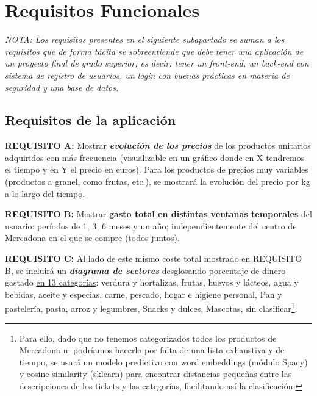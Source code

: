 \documentclass[a4paper,12pt]{report}
\begin{document}
		
		
		
		\section{Requisitos Funcionales}
		
			\textit{NOTA: Los requisitos presentes en el siguiente subapartado se suman a los requisitos que de forma tácita se sobreentiende que debe tener una aplicación de un proyecto final de grado superior; es decir: tener un front-end, un back-end con sistema de registro de usuarios, un login con buenas prácticas en materia de seguridad y una base de datos.}
		
		
			\subsection{Requisitos de la aplicación}
			\label{sec:requisitosAplicacion}
			
		

			

			
		
			
			\textbf{REQUISITO A:} Mostrar\textbf{ \textit{evolución de los precios}} de los productos unitarios adquiridos \underline{con más frecuencia} (visualizable en un gráfico donde en X tendremos el tiempo y en Y el precio en euros). Para los productos de precios muy variables (productos a granel, como frutas, etc.), se mostrará la evolución del precio por kg a lo largo del tiempo.
			
			\textbf{REQUISITO B:} Mostrar {\textbf{gasto total en distintas ventanas temporales}} del usuario: períodos de 1, 3, 6 meses y un año; independientemente del centro de Mercadona en el que se compre (todos juntos).
			
			\textbf{REQUISITO C:} Al lado de este mismo coste total mostrado en REQUISITO B, se incluirá un \textbf{\textit{diagrama de sectores}} desglosando \underline{porcentaje de dinero} gastado \underline{en 13 categorías}: verdura y hortalizas, frutas, huevos y lácteos, agua y bebidas, aceite y especias, carne, pescado, hogar e higiene personal, Pan y pastelería, pasta, arroz y legumbres, Snacks y dulces, Mascotas, sin clasificar\footnote{Para ello, dado que no tenemos categorizados todos los productos de Mercadona ni podríamos hacerlo por falta de una lista exhaustiva y de tiempo, se usará un modelo predictivo con word embeddings (módulo Spacy) y cosine similarity (sklearn) para encontrar distancias pequeñas entre las descripciones de los tickets y las categorías, facilitando así la clasificación.}.
			
\end{document}
